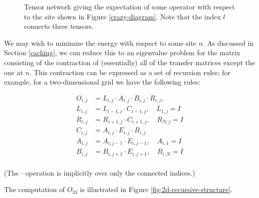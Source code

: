 \documentclass[12pt]{amsbook}
\theoremstyle{plain}
\theoremstyle{definition}
\theoremstyle{remark}
\begin{document}
\begin{figure}
\centering
{}
\caption{\label{crazy-transfer-matrix-network} Tensor network giving the expectation of some operator with respect to the site shown in Figure \ref{crazy-diagram}.  Note that the index $l$ connects three tensors.}
\end{figure}

We may wish to minimize the energy with respect to some site $n$.  As discussed in Section \ref{caching}, we can reduce this to an eigenvalue problem for the matrix consisting of the contraction of (essentially) all of the transfer matrices except the one at $n$.  This contraction can be expressed as a set of recursion rules;  for example, for a two-dimensional grid we have the following rules:

$$
\begin{aligned}
O_{i,j} &= L_{i,j} \cdot A_{i,j} \cdot B_{i,j} \cdot R_{i,j}, \\
L_{i,j} &= L_{i-1,j}\cdot C_{i-1,j}, \quad L_{1,j} = I \\
R_{i,j} &= R_{i+1,j}\cdot C_{i+1,j}, \quad R_{N,j} = I \\
C_{i,j} &= A_{i,j}\cdot E_{i,j} \cdot B_{i,j} \\
A_{i,j} &= A_{i,j-1}\cdot E_{i,j-1}, \quad A_{i,1} = I \\
B_{i,j} &= B_{i,j+1}\cdot E_{i,j+1}, \quad B_{i,N} = I \\
\end{aligned}
$$

\noindent (The $\cdot$ operation is implicitly over only the connected indices.)

The computation of $O_{33}$ is illustrated in Figure \ref{fig:2d-recursive-structure}.
\end{document}
